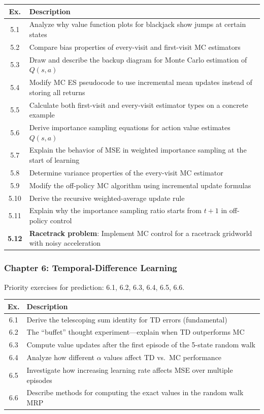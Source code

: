 \documentclass[11pt,letterpaper]{article}
\begin{document}
\begin{longtable}{@{}cp{4.8in}@{}}
\toprule
\textbf{Ex.} & \textbf{Description} \\
\midrule
\endhead
5.1 & Analyze why value function plots for blackjack show jumps at certain states \\
5.2 & Compare bias properties of every-visit and first-visit MC estimators \\
5.3 & Draw and describe the backup diagram for Monte Carlo estimation of $Q(s,a)$ \\
5.4 & Modify MC ES pseudocode to use incremental mean updates instead of storing all returns \\
5.5 & Calculate both first-visit and every-visit estimator types on a concrete example \\
5.6 & Derive importance sampling equations for action value estimates $Q(s,a)$ \\
5.7 & Explain the behavior of MSE in weighted importance sampling at the start of learning \\
5.8 & Determine variance properties of the every-visit MC estimator \\
5.9 & Modify the off-policy MC algorithm using incremental update formulas \\
5.10 & Derive the recursive weighted-average update rule \\
5.11 & Explain why the importance sampling ratio starts from $t+1$ in off-policy control \\
\textbf{5.12} & \textbf{Racetrack problem}: Implement MC control for a racetrack gridworld with noisy acceleration \\
\bottomrule
\end{longtable}

\subsubsection{Chapter 6: Temporal-Difference Learning}

Priority exercises for prediction: 6.1, 6.2, 6.3, 6.4, 6.5, 6.6.

\begin{longtable}{@{}cp{4.8in}@{}}
\toprule
\textbf{Ex.} & \textbf{Description} \\
\midrule
\endhead
6.1 & Derive the telescoping sum identity for TD errors (fundamental) \\
6.2 & The ``buffet'' thought experiment---explain when TD outperforms MC \\
6.3 & Compute value updates after the first episode of the 5-state random walk \\
6.4 & Analyze how different $\alpha$ values affect TD vs.\ MC performance \\
6.5 & Investigate how increasing learning rate affects MSE over multiple episodes \\
6.6 & Describe methods for computing the exact values in the random walk MRP \\
\bottomrule
\end{longtable}
\end{document}
